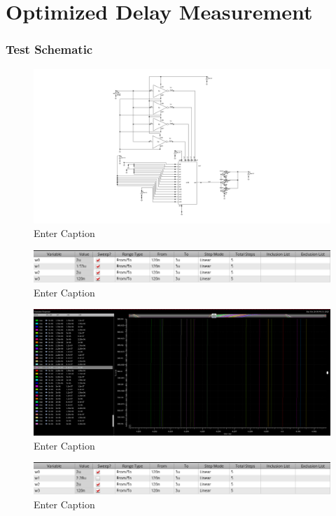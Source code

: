 \documentclass[12pt]{article}
\begin{document}
\newpage
\section{Optimized Delay Measurement}
\subsubsection{Test Schematic}
\begin{figure}[H]
    \centering
    \includegraphics[width=0.5\linewidth]{writeup//figures/updated_delay_opt_testschem.png}
    \caption{Enter Caption}
\end{figure}

\newpage

\begin{figure}[H]
    \centering
    \includegraphics[width=0.5\linewidth]{writeup//figures/wmux_all_parametric_sweep_setup.png}
    \caption{Enter Caption}
\end{figure}

\begin{figure}[H]
    \centering
    \includegraphics[width=\linewidth]{writeup//figures/wmux_all_zoomed_parametrics_weep2.png}
    \caption{Enter Caption}
\end{figure}

\begin{figure}
    \centering
    \includegraphics[width=1\linewidth]{writeup//figures/wmux_3_parametric_sweep_setup.png}
    \caption{Enter Caption}
\end{figure}
\end{document}
